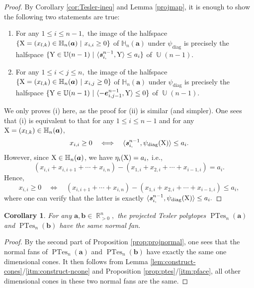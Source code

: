 \documentclass[12pt]{amsart}
\numberwithin{equation}{section}
\newtheorem{cor}[thm]{Corollary}
\theoremstyle{definition}
\def\ptes{\operatorname{PTes}}
\def\diag{\operatorname{diag}}
\def\ba{{\boldsymbol{a}}}
\def\bb{{\boldsymbol{b}}}
\def\be{{\boldsymbol{e}}}
\def\hs{\eta}
\def\sm{\boldsymbol{\operatorname{\mathit{s}}}}
\def\XX{{\rm{X}}}
\def\YY{{\rm{Y}}}
\def\U{\operatorname{\mathbb{U}}}
\def\R{\operatorname{\mathbb{R}}}
\def\H{\mathbb{H}}
\begin{document}
\begin{proof}
  By Corollary \ref{cor:Tesler-ineq} and Lemma \ref{projmap}, it is enough to show the following two statements are true:
  \begin{enumerate}[label=(\roman*)]
    \item For any $1 \le i \le n-1,$ the image of the halfspace $\{ \XX=(x_{l,k}) \in \H_n(\ba) \ | \ x_{i,i} \ge 0 \}$ of $\H_n(\ba)$ under $\psi_{\diag}$ is precisely the halfspace $\{ \YY \in \U(n-1) \ | \  \langle \sm_{i,}^{n-1}, \YY \rangle \le a_i\}$ of $\U(n-1)$.
    \item For any $1 \le i < j \le n,$ the image of the halfspace $\{ \XX=(x_{l,k}) \in \H_n(\ba) \ | \ x_{i,j} \ge 0 \}$ of $\H_n(\ba)$ under $\psi_{\diag}$ is precisely the halfspace $\{ \YY \in \U(n-1) \ | \  \langle -\be_{i,j-1}^{n-1}, \YY \rangle \le 0\}$ of $\U(n-1)$.
  \end{enumerate}
  We only proves (i) here, as the proof for (ii) is similar (and simpler). One sees that (i) is equivalent to that for any $1 \le i \le n-1$ and for any $\XX = (x_{l,k}) \in \H_n(\ba)$,
  \[ x_{i,i} \ge 0 \quad \Longleftrightarrow \quad \langle \sm_{i,}^{n-1}, \psi_{\diag}(\XX) \rangle \le a_i.\] 
  However, since $\XX \in \H_n(\ba)$, we have $\hs_i(\XX) = a_i,$ i.e.,
\[ (x_{i,i}+x_{i,i+1}+\cdots+x_{i,n}) - (x_{1,i}+x_{2,i}+\cdots+x_{i-1,i}) = a_i.\]
Hence,
\[ x_{i,i} \ge 0 \quad \Longleftrightarrow \quad  (x_{i,i+1}+\cdots+x_{i,n}) - (x_{1,i}+x_{2,i}+\cdots+x_{i-1,i}) \le a_i,\]
where one can verify that the latter is exactly $\langle \sm_{i,}^{n-1}, \psi_{\diag}(\XX) \rangle \le a_i.$
\end{proof}

\begin{cor}\label{cor:ptesnormalfan}
  For any $\ba, \bb \in \R_{>0}^n,$ the projected Tesler polytopes $\ptes_n(\ba)$ and $\ptes_n(\bb)$ have the same normal fan.
  \end{cor}

  \begin{proof}
    By the second part of Proposition \ref{prop:projnormal}, one sees that the normal fans of $\ptes_n(\ba)$ and $\ptes_n(\bb)$ have exactly the same one dimensional cones.
    It then follows from Lemma \ref{lem:construct-cones}/\eqref{itm:construct-ncone} and Proposition \ref{prop:ptes}/\eqref{itm:pface}, all other dimensional cones in these two normal fans are the same.
  \end{proof}
\end{document}
